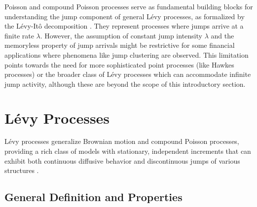 \documentclass[11pt,twoside,openright]{report}
\begin{document}
Poisson and compound Poisson processes serve as fundamental building blocks for understanding the jump component of general Lévy processes, as formalized by the Lévy-Itô decomposition \cite{sato1999levy}. They represent processes where jumps arrive at a finite rate $\lambda$. However, the assumption of constant jump intensity $\lambda$ and the memoryless property of jump arrivals might be restrictive for some financial applications where phenomena like jump clustering are observed. This limitation points towards the need for more sophisticated point processes (like Hawkes processes) or the broader class of Lévy processes which can accommodate infinite jump activity, although these are beyond the scope of this introductory section.

\section{Lévy Processes}
\label{sec:levy_general}

Lévy processes generalize Brownian motion and compound Poisson processes, providing a rich class of models with stationary, independent increments that can exhibit both continuous diffusive behavior and discontinuous jumps of various structures \cite{applebaum2009levy, sato1999levy}.

\subsection{General Definition and Properties}
\label{subsec:levy_def_props}
\end{document}
